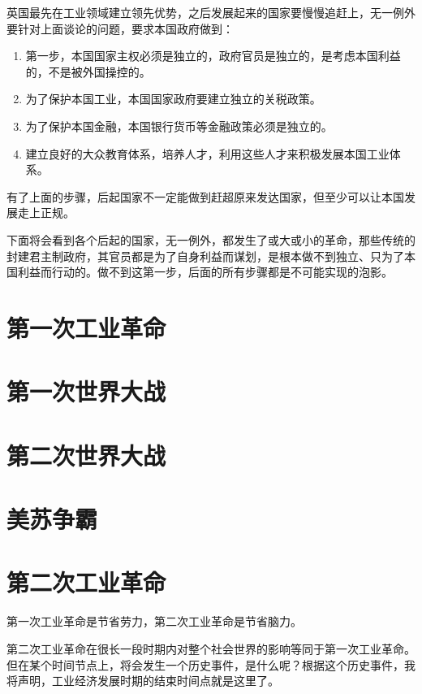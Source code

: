 \documentclass[12pt,oneside]{book}
\begin{document}
英国最先在工业领域建立领先优势，之后发展起来的国家要慢慢追赶上，无一例外要针对上面谈论的问题，要求本国政府做到：

\begin{enumerate}
\item 第一步，本国国家主权必须是独立的，政府官员是独立的，是考虑本国利益的，不是被外国操控的。
\item 为了保护本国工业，本国国家政府要建立独立的关税政策。
\item 为了保护本国金融，本国银行货币等金融政策必须是独立的。
\item 建立良好的大众教育体系，培养人才，利用这些人才来积极发展本国工业体系。
\end{enumerate}

有了上面的步骤，后起国家不一定能做到赶超原来发达国家，但至少可以让本国发展走上正规。

下面将会看到各个后起的国家，无一例外，都发生了或大或小的革命，那些传统的封建君主制政府，其官员都是为了自身利益而谋划，是根本做不到独立、只为了本国利益而行动的。做不到这第一步，后面的所有步骤都是不可能实现的泡影。



\chapter{第一次工业革命}





\chapter{第一次世界大战}


\chapter{第二次世界大战}

\chapter{美苏争霸}


\chapter{第二次工业革命}
第一次工业革命是节省劳力，第二次工业革命是节省脑力。

第二次工业革命在很长一段时期内对整个社会世界的影响等同于第一次工业革命。但在某个时间节点上，将会发生一个历史事件，是什么呢？根据这个历史事件，我将声明，工业经济发展时期的结束时间点就是这里了。
\end{document}
